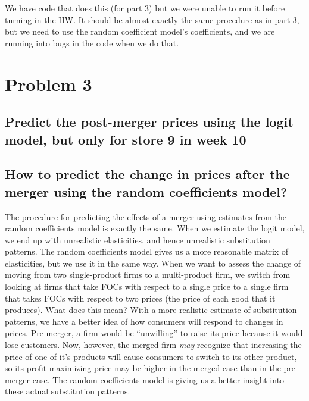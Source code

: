 \documentclass[dvipsnames]{article}
\begin{document}
We have code that does this (for part 3) but we were unable to run it before turning in the HW. It should be almost exactly the same procedure as in part 3, but we need to use the random coefficient model's coefficients, and we are running into bugs in the code when we do that.

\newpage
\section*{Problem 3}
\subsection*{Predict the post-merger prices using the logit model, but only for store 9 in week 10}

\begin{table}[htp]
  \centering
  
\end{table}

\subsection*{How to predict the change in prices after the merger using the random coefficients model?}

The procedure for predicting the effects of a merger using estimates from the random coefficients model is exactly the same. When we estimate the logit model, we end up with unrealistic elasticities, and hence unrealistic substitution patterns. The random coefficients model gives us a more reasonable matrix of elasticities, but we use it in the same way. When we want to assess the change of moving from two single-product firms to a multi-product firm, we switch from looking at firms that take FOCs with respect to a single price to a single firm that takes FOCs with respect to two prices (the price of each good that it produces). What does this mean? With a more realistic estimate of substitution patterns, we have a better idea of how consumers will respond to changes in prices. Pre-merger, a firm would be ``unwilling'' to raise its price because it would lose customers. Now, however, the merged firm \emph{may} recognize that increasing the price of one of it's products will cause consumers to switch to its other product, so its profit maximizing price may be higher in the merged case than in the pre-merger case. The random coefficients model is giving us a better insight into these actual substitution patterns.
\end{document}
